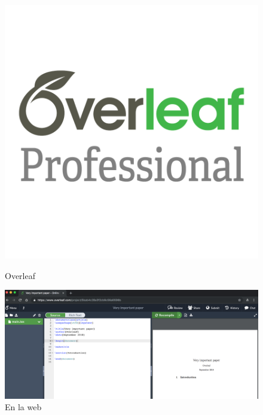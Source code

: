 \documentclass{article}
\begin{document}
\begin{figure}[ht]
    \centering
    \begin{minipage}[b]{0.45\linewidth}
        \centering
        \includegraphics[width=\linewidth]{latex.png} %
        \caption{Overleaf}
        \label{fig:imagen1}
    \end{minipage}
    \hspace{0.5cm}
    \begin{minipage}[b]{0.45\linewidth}
        \centering
        \includegraphics[width=\linewidth]{latex1.png} %
        \caption{En la web}
        \label{fig:imagen2}
    \end{minipage}
\end{figure}
\end{document}
